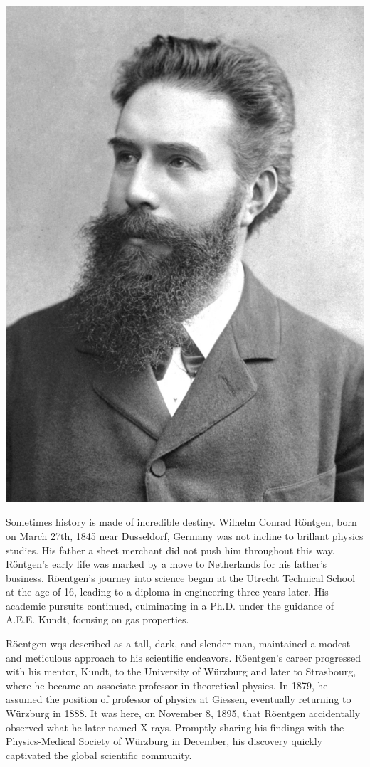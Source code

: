 \documentclass[a4paper,12pt]{report}
\begin{document}
\begin{center}
  \includegraphics[scale=0.3]{roentgen.png}
  \label{fig=Röntgen}
\end{center}

Sometimes history is made of incredible destiny. Wilhelm Conrad Röntgen, born on March
27th, 1845 near Dusseldorf, Germany was not incline to brillant physics studies. His father a
sheet merchant did not push him throughout this way. Röntgen's early life was marked by a
move to Netherlands for his father's business. Röentgen's journey into science began at the
Utrecht Technical School at the age of 16, leading to a diploma in engineering three years later.
His academic pursuits continued, culminating in a Ph.D. under the guidance of A.E.E. Kundt,
focusing on gas properties.

Röentgen wqs described as a tall, dark, and slender man, maintained a modest and meticulous
approach to his scientific endeavors. Röentgen's career progressed with his mentor, Kundt, to the
University of Würzburg and later to Strasbourg, where he became an associate professor in
theoretical physics. In 1879, he assumed the position of professor of physics at Giessen,
eventually returning to Würzburg in 1888. It was here, on November 8, 1895, that Röentgen
accidentally observed what he later named X-rays. Promptly sharing his findings with the
Physics-Medical Society of Würzburg in December, his discovery quickly captivated the global
scientific community.
\end{document}
